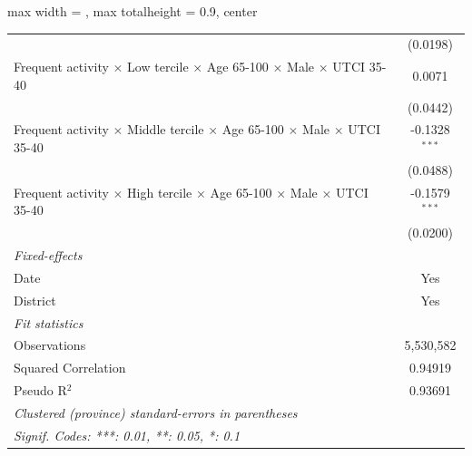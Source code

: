 \begin{table}[htbp]
\begin{adjustbox}{max width = \textwidth, max totalheight = 0.9\textheight, center}
\begin{tabular}{lc}
                                                                                                               & (0.0198)\\   
         Frequent activity $\times$ Low tercile $\times$ Age 65-100 $\times$ Male $\times$ UTCI 35-40          & 0.0071\\   
                                                                                                               & (0.0442)\\   
         Frequent activity $\times$ Middle tercile $\times$ Age 65-100 $\times$ Male $\times$ UTCI 35-40       & -0.1328$^{***}$\\   
                                                                                                               & (0.0488)\\   
         Frequent activity $\times$ High tercile $\times$ Age 65-100 $\times$ Male $\times$ UTCI 35-40         & -0.1579$^{***}$\\   
                                                                                                               & (0.0200)\\   
         \midrule
         \emph{Fixed-effects}\\
         Date                                                                                                  & Yes\\  
         District                                                                                              & Yes\\  
         \midrule
         \emph{Fit statistics}\\
         Observations                                                                                          & 5,530,582\\  
         Squared Correlation                                                                                   & 0.94919\\  
         Pseudo R$^2$                                                                                          & 0.93691\\  
         \midrule \midrule
         \multicolumn{2}{l}{\emph{Clustered (province) standard-errors in parentheses}}\\
         \multicolumn{2}{l}{\emph{Signif. Codes: ***: 0.01, **: 0.05, *: 0.1}}\\
      \end{tabular}
   \end{adjustbox}
\end{table}



